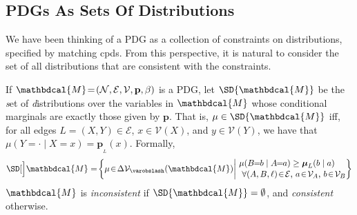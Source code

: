 \documentclass{article}
\theoremstyle{plain}
\theoremstyle{definition}
\theoremstyle{remark}
\newcommand\mat[1]{\mathbf{#1}}
\newcommand{\notation}[2][]{#1}
\renewcommand{\notation}[2][]{{\color{notationcolor} #2}}
\newcommand{\none}{\varobslash}
\def\sheq{\!=\!}
\newcommand{\bp}[1][L]{\mat{p}_{\!_{#1}\!}}
\newcommand{\V}{\mathcal V}
\newcommand{\N}{\mathcal N}
\newcommand{\Ed}{\mathcal E}
\newcommand{\pdgvars}[1][]{(\N#1, \Ed#1, \V#1, \mat p#1, \beta#1)}
\newcommand{\dg}[1]{\mathbdcal{#1}}
\numberwithin{equation}{section}
\begin{document}
\subsection{PDGs As Sets Of Distributions}\label{sec:set-of-distribution-semantics} 
We have been thinking of a PDG as a collection of constraints on distributions, specified by matching cpds. From this perspective, 
it is natural to consider
the set of all distributions that are consistent with the constraints.

\begin{defn} \label{def:set-semantics} 
If $\dg M\sheq\pdgvars[]$ is a PDG, let $\SD{\dg M}$ be the \emph{s}et of \emph{d}istributions over the variables in $\dg M$ 
whose conditional marginals are exactly those given by $\mat p$.
That is, $\mu \in \SD{\dg M}$ iff, for all edges $L = (X,Y) \in \Ed$,  $x \in \V(X)$,  and $y \in \V(Y)$, we have that $\mu(Y = \cdot \mid X\sheq x) = \bp(x)$.
\notation{Formally,		
        \[ \SD[\Big]\dg M = \!\left\{\mu \!\in\! \Delta \V_\none (\dg M) \middle|\!
        \begin{array}{l}
        \mu(B\!\! =\!\!b \mid A\!\!=\!\!a) \geq \boldsymbol\mu_L(b \mid a) \\[0.1em]
        ~\text{$\forall (A, B,\ell) \!\in\! \Ed$, $a \!\in\!\mathcal V_A$, $b \!\in\! \mathcal V_B$} \end{array}\!\!\! \right\}\]
    }
$\dg M$ is \emph{inconsistent} if $\SD{\dg M} = \emptyset$, and \emph{consistent} otherwise.
\end{defn}
\end{document}
